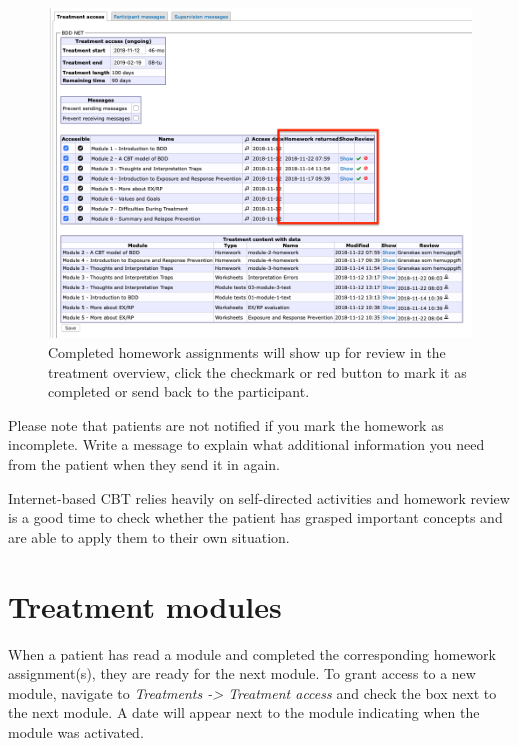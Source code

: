 \documentclass[]{book}
\begin{document}
\begin{figure}
\centering
\includegraphics{images/homework-complete.png}
\caption{Completed homework assignments will show up for review in the treatment overview, click the checkmark or red button to mark it as completed or send back to the participant.}
\end{figure}

Please note that patients are not notified if you mark the homework as incomplete. Write a message to explain what additional information you need from the patient when they send it in again.

Internet-based CBT relies heavily on self-directed activities and homework review is a good time to check whether the patient has grasped important concepts and are able to apply them to their own situation.

\hypertarget{treatment-modules}{%
\section{Treatment modules}\label{treatment-modules}}

When a patient has read a module and completed the corresponding homework assignment(s), they are ready for the next module. To grant access to a new module, navigate to \emph{Treatments -\textgreater{} Treatment access} and check the box next to the next module. A date will appear next to the module indicating when the module was activated.
\end{document}
